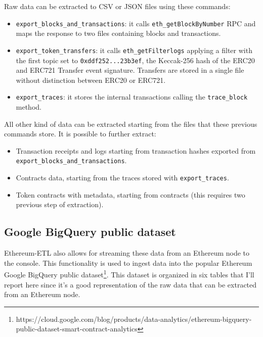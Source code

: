 \noindent Raw data can be extracted to CSV or JSON files using these commands:

\begin{itemize}
    \item \verb|export_blocks_and_transactions|: it calls \verb|eth_getBlockByNumber| RPC and maps the response to two files containing blocks and transactions.
    \item \verb|export_token_transfers|: it calls \verb|eth_getFilterlogs| applying a filter with the first topic set to \verb|0xddf252...23b3ef|, the Keccak-256 hash of the ERC20 and ERC721 Transfer event signature. Transfers are stored in a single file without distinction between ERC20 or ERC721.   
    \item \verb|export_traces|: it stores the internal transactions calling the \verb|trace_block| method.
\end{itemize}

\noindent All other kind of data can be extracted starting from the files that these previous commands store. It is possible to further extract:

\begin{itemize}
    \item Transaction receipts and logs starting from transaction hashes exported from \verb|export_blocks_and_transactions|.
    \item Contracts data, starting from the traces stored with \verb|export_traces|.
    \item Token contracts with metadata, starting from contracts (this requires two previous step of extraction). 
\end{itemize}

\subsection{Google BigQuery public dataset}

\noindent Ethereum-ETL also allows for streaming these data from an Ethereum node to the console. This functionality is used to ingest data into the popular Ethereum Google BigQuery public dataset\footnote{https://cloud.google.com/blog/products/data-analytics/ethereum-bigquery-public-dataset-smart-contract-analytics}. This dataset is organized in six tables that I'll report here since it's a good representation of the raw data that can be extracted from an Ethereum node.

